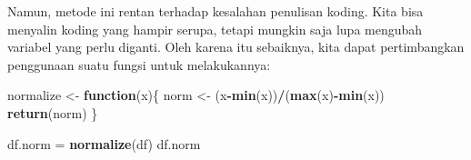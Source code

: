 \documentclass[
]{book}
\newenvironment{Shaded}{\begin{snugshade}}{\end{snugshade}}
\newcommand{\ControlFlowTok}[1]{\textcolor[rgb]{0.13,0.29,0.53}{\textbf{#1}}}
\newcommand{\FunctionTok}[1]{\textcolor[rgb]{0.13,0.29,0.53}{\textbf{#1}}}
\newcommand{\NormalTok}[1]{#1}
\newcommand{\OtherTok}[1]{\textcolor[rgb]{0.56,0.35,0.01}{#1}}
\newcommand{\SpecialCharTok}[1]{\textcolor[rgb]{0.81,0.36,0.00}{\textbf{#1}}}
\begin{document}
Namun, metode ini rentan terhadap kesalahan penulisan koding. Kita bisa menyalin koding yang hampir serupa, tetapi mungkin saja lupa mengubah variabel yang perlu diganti. Oleh karena itu sebaiknya, kita dapat pertimbangkan penggunaan suatu fungsi untuk melakukannya:

\begin{Shaded}
\begin{Highlighting}[]
\NormalTok{normalize }\OtherTok{\textless{}{-}} \ControlFlowTok{function}\NormalTok{(x)\{}
\NormalTok{  norm }\OtherTok{\textless{}{-}}\NormalTok{ (x}\SpecialCharTok{{-}}\FunctionTok{min}\NormalTok{(x))}\SpecialCharTok{/}\NormalTok{(}\FunctionTok{max}\NormalTok{(x)}\SpecialCharTok{{-}}\FunctionTok{min}\NormalTok{(x))}
  \FunctionTok{return}\NormalTok{(norm)}
\NormalTok{\}}
\end{Highlighting}
\end{Shaded}

\begin{Shaded}
\begin{Highlighting}[]
\NormalTok{df.norm }\OtherTok{=} \FunctionTok{normalize}\NormalTok{(df)}
\NormalTok{df.norm}
\end{Highlighting}
\end{Shaded}
\end{document}
